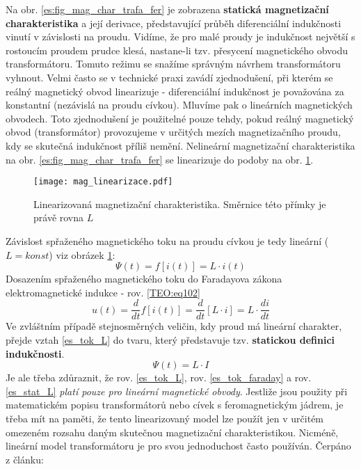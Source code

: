     Na obr. \ref{es:fig_mag_char_trafa_fer} je zobrazena \textbf{statická magnetizační 
    charakteristika} a její derivace, představující průběh diferenciální indukčnosti vinutí v 
    závislosti na proudu. Vidíme, že pro malé proudy je indukčnost největší s rostoucím proudem 
    prudce klesá, nastane-li tzv. přesycení magnetického obvodu transformátoru. Tomuto režimu se 
    snažíme správným návrhem transformátoru vyhnout. Velmi často se v technické praxi zavádí 
    zjednodušení, při kterém se reálný magnetický obvod linearizuje - diferenciální indukčnost je 
    považována za konstantní (nezávislá na proudu cívkou). Mluvíme pak o lineárních magnetických 
    obvodech. Toto zjednodušení je použitelné pouze tehdy, pokud reálný magnetický obvod 
    (transformátor) provozujeme v určitých mezích magnetizačního proudu, kdy se skutečná indukčnost
    příliš nemění. Nelineární magnetizační charakteristika na obr. \ref{es:fig_mag_char_trafa_fer} 
    se linearizuje do podoby na obr. \ref{figure:mag_lin}.

    \begin{figure}[ht!]   %
      \centering
      \texttt{[image: mag\_linearizace.pdf]}
      \caption{Linearizovaná magnetizační charakteristika. Směrnice této přímky je právě rovna $L$}
      \label{figure:mag_lin}
    \end{figure}
    Závislost spřaženého magnetického toku na proudu cívkou je tedy lineární ($L=konst$) viz obrázek
    \ref{figure:mag_lin}:
    \begin{equation}\label{es_tok_L}
      \Psi(t)=f[i(t)] = L \cdot i(t)
    \end{equation}    
    Dosazením spřaženého magnetického toku do Faradayova zákona elektromagnetické indukce - rov.
    \ref{TEO:eq102}
    \begin{equation}\label{es_tok_faraday}
        u(t)=\frac{d}{dt}f[i(t)]=\frac{d}{dt}[L\cdot i]=L\cdot\frac{di}{dt}
    \end{equation}
    Ve zvláštním případě stejnosměrných veličin, kdy proud má lineární charakter, přejde vztah
    \ref{es_tok_L} do tvaru, který představuje tzv. \textbf{statickou definici indukčnosti}.
    \begin{equation}\label{es_stat_L}
      \Psi(t)= L \cdot I
    \end{equation}
    Je ale třeba zdůraznit, že rov. \ref{es_tok_L}, rov. \ref{es_tok_faraday} a rov. 
    \ref{es_stat_L} \emph{platí pouze pro lineární magnetické obvody}. Jestliže jsou použity při 
    matematickém popisu transformátorů nebo cívek s feromagnetickým jádrem, je třeba mít na paměti, 
    že tento linearizovaný model lze použít jen v určitém omezeném rozsahu daným skutečnou 
    magnetizační charakteristikou. Nicméně, lineární model transformátoru je pro svou jednoduchost 
    často používán. Čerpáno z článku: \librarianTrafoModel
    
